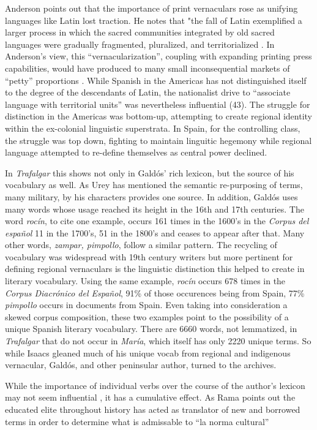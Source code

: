\documentclass[12pt]{report}
\begin{document}
Anderson points out that the importance of print vernaculars rose as unifying languages like Latin lost traction.
He notes that "the fall of Latin exemplified a larger process in which the sacred communities integrated by old sacred languages were gradually fragmented, pluralized, and territorialized \cite[19]{Anderson2006}. 
In Anderson's view, this \enquote{vernacularization}, coupling with expanding printing press capabilities, would have produced to many small inconsequential markets of \enquote{petty} proportions \cite[43]{Anderson2006}.
While Spanish in the Americas has not distinguished itself to the degree of the descendants of Latin, the nationalist drive to \enquote{associate language with territorial units} was nevertheless influential (43).
The struggle for distinction in the Americas was bottom-up, attempting to create regional identity within the ex-colonial linguistic superstrata.
In Spain, for the controlling class, the struggle was top down, fighting to maintain linguitic hegemony while regional language attempted to re-define themselves as central power declined.

In \textit{Trafalgar} this shows not only in Galdós' rich lexicon, but the source of his vocabulary as well. 
As Urey has mentioned the semantic re-purposing of terms, many military, by his characters provides one source.
In addition, Galdós uses many words whose usage reached its height in the 16th and 17th centuries.
The word \textit{rocín}, to cite one example, occurs 161 times in the 1600's in the \textit{Corpus del español} 11 in the 1700's, 51 in the 1800's and ceases to appear after that. 
Many other words, \textit{zampar, pimpollo}, follow a similar pattern.
The recycling of vocabulary was widespread with 19th century writers but more pertinent for defining regional vernaculars is the linguistic distinction this helped to create in literary vocabulary.
Using the same example, \textit{rocín} occurs 678 times in the \textit{Corpus Diacrónico del Español}, 91\% of those occurences being from Spain, 77\% \textit{pimpollo} occurs in documents from Spain. 
Even taking into consideration a skewed corpus composition, these two examples point to the possibility of a unique Spanish literary vocabulary.
There are 6660 words, not lemmatized, in \textit{Trafalgar} that do not occur in \textit{María}, which itself has only 2220 unique terms.
So while Isaacs gleaned much of his unique vocab from regional and indigenous vernacular, Galdós, and other peninsular author, turned to the archives.

While the importance of individual verbs over the course of the author's lexicon may not seem influential , it has a cumulative effect.
As Rama points out the educated elite throughout history has acted as translator of new and borrowed terms in order to determine what is admissable to \enquote{la norma cultural} \cite[50]{Rama2002}
\end{document}
